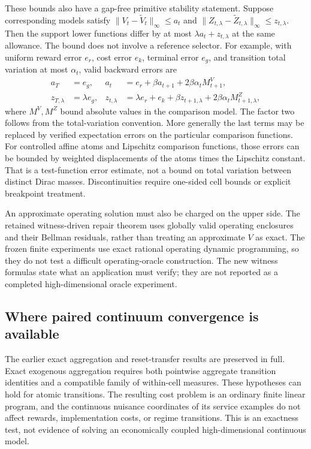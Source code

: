 These bounds also have a gap-free primitive stability statement. Suppose corresponding models satisfy $\|V_t-\widetilde V_t\|_\infty\le a_t$ and $\|Z_{t,\lambda}-\widetilde Z_{t,\lambda}\|_\infty\le z_{t,\lambda}$. Then the support lower functions differ by at most $\lambda a_t+z_{t,\lambda}$ at the same allowance. The bound does not involve a reference selector. For example, with uniform reward error $e_r$, cost error $e_k$, terminal error $e_g$, and transition total variation at most $\alpha_t$, valid backward errors are
\begin{align}
 a_T&=e_g,&a_t&=e_r+\beta a_{t+1}+2\beta\alpha_t M^V_{t+1},\label{eq:stab45}\\
 z_{T,\lambda}&=\lambda e_g,&z_{t,\lambda}&=\lambda e_r+e_k+\beta z_{t+1,\lambda}
                     +2\beta\alpha_t M^Z_{t+1,\lambda},\nonumber
\end{align}
where $M^V,M^Z$ bound absolute values in the comparison model. The factor two follows from the total-variation convention. More generally the last terms may be replaced by verified expectation errors on the particular comparison functions. For controlled affine atoms and Lipschitz comparison functions, those errors can be bounded by weighted displacements of the atoms times the Lipschitz constant. That is a test-function error estimate, not a bound on total variation between distinct Dirac masses. Discontinuities require one-sided cell bounds or explicit breakpoint treatment.

An approximate operating solution must also be charged on the upper side. The retained witness-driven repair theorem uses globally valid operating enclosures and their Bellman residuals, rather than treating an approximate $V$ as exact. The frozen finite experiments use exact rational operating dynamic programming, so they do not test a difficult operating-oracle construction. The new witness formulas state what an application must verify; they are not reported as a completed high-dimensional oracle experiment.

\subsection{Where paired continuum convergence is available}\label{sec:structural45}
The earlier exact aggregation and reset-transfer results are preserved in full. Exact exogenous aggregation requires both pointwise aggregate transition identities and a compatible family of within-cell measures. These hypotheses can hold for atomic transitions. The resulting cost problem is an ordinary finite linear program, and the continuous nuisance coordinates of its service examples do not affect rewards, implementation costs, or regime transitions. This is an exactness test, not evidence of solving an economically coupled high-dimensional continuous model.

